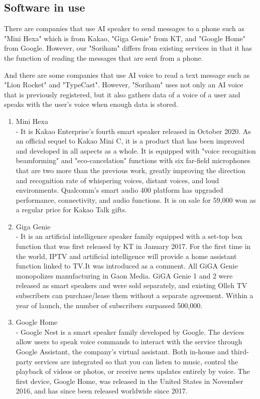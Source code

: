 \documentclass[conference]{IEEEtran}
\begin{document}
\subsection{Software in use}
There are companies that use AI speaker to send messages to a phone such as "Mini Hexa" which is from Kakao, "Giga Genie" from KT, and "Google Home" from Google. However, our "Soriham" differs from existing services in that it has the function of reading the messages that are sent from a phone. 

And there are some companies that use AI voice to read a text message such as "Lion Rocket" and "TypeCast". However, "Soriham" uses not only an AI voice that is previously registered, but it also gathers data of a voice of a user and speaks with the user's voice when enough data is stored.

\begin{enumerate}
    \item Mini Hexa\\
    - It is Kakao Enterprise's fourth smart speaker released in October 2020. As an official sequel to Kakao Mini C, it is a product that has been improved and developed in all aspects as a whole. It is equipped with "voice recognition beamforming" and "eco-cancelation" functions with six far-field microphones that are two more than the previous work, greatly improving the direction and recognition rate of whispering voices, distant voices, and loud environments. Qualcomm's smart audio 400 platform has upgraded performance, connectivity, and audio functions. It is on sale for 59,000 won as a regular price for Kakao Talk gifts.
    \item Giga Genie\\
    - It is an artificial intelligence speaker family equipped with a set-top box function that was first released by KT in January 2017. For the first time in the world, IPTV and artificial intelligence will provide a home assistant function linked to TV.It was introduced as a comment. All GiGA Genie monopolizes manufacturing in Gaon Media.
    GiGA Genie 1 and 2 were released as smart speakers and were sold separately, and existing Olleh TV subscribers can purchase/lease them without a separate agreement. Within a year of launch, the number of subscribers surpassed 500,000.
    \item Google Home\\
    - Google Nest is a smart speaker family developed by Google. The devices allow users to speak voice commands to interact with the service through Google Assistant, the company's virtual assistant. Both in-house and third-party services are integrated so that you can listen to music, control the playback of videos or photos, or receive news updates entirely by voice. The first device, Google Home, was released in the United States in November 2016, and has since been released worldwide since 2017.

\end{enumerate}
\end{document}
